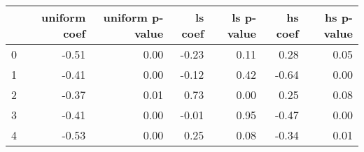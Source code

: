 \begin{tabular}{lrrrrrr}
\toprule
 & uniform coef & uniform p-value & ls coef & ls p-value & hs coef & hs p-value \\
\midrule
0 & -0.51 & 0.00 & -0.23 & 0.11 & 0.28 & 0.05 \\
1 & -0.41 & 0.00 & -0.12 & 0.42 & -0.64 & 0.00 \\
2 & -0.37 & 0.01 & 0.73 & 0.00 & 0.25 & 0.08 \\
3 & -0.41 & 0.00 & -0.01 & 0.95 & -0.47 & 0.00 \\
4 & -0.53 & 0.00 & 0.25 & 0.08 & -0.34 & 0.01 \\
\bottomrule
\end{tabular}
